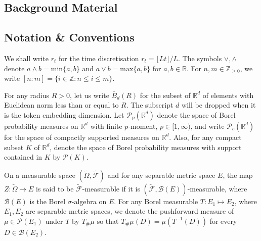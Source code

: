 \documentclass{article}
\newcommand{\R}{\mathbb{R}}
\begin{document}
\begin{appendices}
\section{Background Material}\label{App:A}
\subsection{Notation \& Conventions}\label{App:A1}
We shall write $r_t$ for the time discretisation $r_t=\lfloor L t \rfloor/L$. The symbols $\vee,\wedge$ denote $a\wedge b =\mathrm{min}\{a,b\}$ and $a\vee b =\mathrm{max}\{a,b\}$ for $a,b\in\R$. For $n,m \in \mathbb Z_{\ge 0}$, we write $[n:m]=\{i \in \mathbb Z: n\le i \le m\}$.


For any radius $R>0$, let us write $\bar B_d(R)$ for the subset of $\R^d$ of elements with Euclidean norm less than or equal to $R$. The subscript $d$ will be dropped when it is the token embedding dimension. Let $\mathcal P_p(\R^d)$ denote the space of Borel probability measures on $\R^d$ with finite $p$-moment, $p\in [1,\infty)$, and write $\mathcal P_c(\R^d)$ for the space of compactly supported measures on $\R^d$. Also, for any compact subset $K$ of $\R^d$, denote the space of Borel probability measures with support contained in $K$ by $\mathcal P(K)$.

On a measurable space $(\widetilde{\Omega},\widetilde{\mathcal F})$ and for any separable metric space $E$, the map $Z:\widetilde{\Omega}\mapsto E$ is said to be $\widetilde{\mathcal F}$-measurable if it is $(\widetilde{\mathcal F},\mathcal B(E))$-measurable, where $\mathcal B(E)$ is the Borel $\sigma$-algebra on $E$. For any Borel measurable $T:E_1\mapsto E_2$, where $E_1,E_2$ are separable metric spaces, we denote the pushforward measure of $\mu\in \mathcal P(E_1)$ under $T$ by $T_\#\mu$ so that $T_\#\mu(D)=\mu(T^{-1}(D))$ for every $D\in \mathcal B(E_2)$.


\end{appendices}
\end{document}
